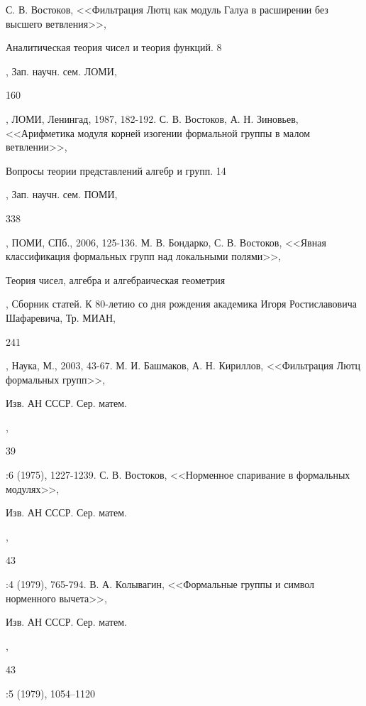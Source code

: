 \documentclass[a4paper]{article}
\begin{document}
\begin{thebibliography}{3}   
    С. В. Востоков, <<Фильтрация Лютц как модуль Галуа в расширении без высшего ветвления>>, \begin{it}Аналитическая теория чисел и теория функций. 8\end{it}, Зап. научн. сем. ЛОМИ, \begin{bf}160\end{bf}, ЛОМИ, Ленингад, 1987, 182-192.           
    С. В. Востоков, А. Н. Зиновьев, <<Арифметика модуля корней изогении формальной группы в малом ветвлении>>, \begin{it}Вопросы теории представлений алгебр и групп. 14\end{it}, Зап. научн. сем. ПОМИ, \begin{bf}338\end{bf}, ПОМИ, СПб., 2006, 125-136.           
    М. В. Бондарко, С. В. Востоков, <<Явная классификация формальных групп над локальными полями>>, \begin{it}Теория чисел, алгебра и алгебраическая геометрия\end{it}, Сборник статей. К 80-летию со дня рождения академика Игоря Ростиславовича Шафаревича, Тр. МИАН, \begin{bf}241\end{bf}, Наука, М., 2003, 43-67.
    М. И. Башмаков, А. Н. Кириллов, <<Фильтрация Лютц формальных групп>>, \begin{it}Изв. АН СССР. Сер. матем.\end{it}, \begin{bf}39\end{bf}:6 (1975), 1227-1239.
    С. В. Востоков, <<Норменное спаривание в формальных модулях>>, \begin{it}Изв. АН СССР. Сер. матем.\end{it}, \begin{bf}43\end{bf}:4 (1979), 765-794.
    В. А. Колывагин, <<Формальные группы и символ норменного вычета>>, \begin{it}Изв. АН СССР. Сер. матем.\end{it}, \begin{bf}43\end{bf}:5 (1979), 1054–1120

\end{thebibliography}  
\end{document}

